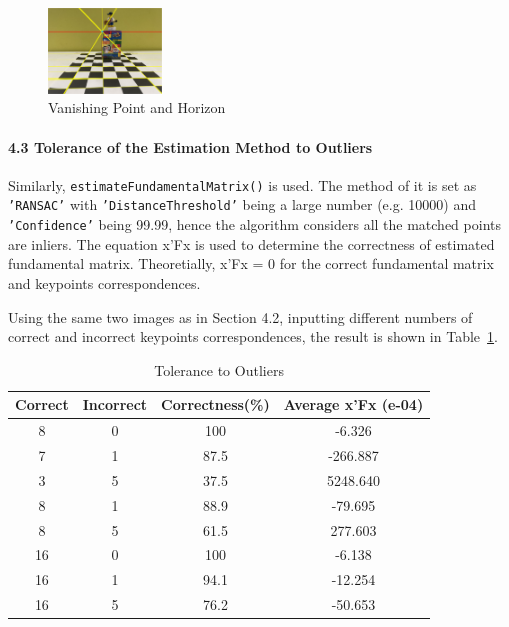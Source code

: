 \documentclass[10pt,twocolumn,letterpaper]{article}
\begin{document}
\begin{figure}[h]
\begin{center}
   \includegraphics[width=0.27\textwidth]{4.2b}
\end{center}
   \caption{Vanishing Point and Horizon}
\label{fig:6}
\end{figure}




\paragraph{4.3 Tolerance of the Estimation Method to Outliers}
Similarly, \texttt{\textcolor[RGB]{28,172,0}{estimateFundamentalMatrix()}} is used. The method of it is set as \texttt{\textcolor[RGB]{170,4,249}{'RANSAC'}} with \texttt{\textcolor[RGB]{170,4,249}{'DistanceThreshold'}} being a large number (e.g. 10000) and \texttt{\textcolor[RGB]{170,4,249}{'Confidence'}} being 99.99, hence the algorithm considers all the matched points are inliers. The equation x'Fx is used to determine the correctness of estimated fundamental matrix. Theoretially, x'Fx = 0 for the correct fundamental matrix and keypoints correspondences.

\noindent Using the same two images as in Section 4.2, inputting different numbers of correct and incorrect keypoints correspondences, the result is shown in Table~\ref{tab:3}.

\begin{table}[h]
\small
    \centering
    \begin{tabular}{c|c|c|c}
        Correct & Incorrect & Correctness(\%) & Average x'Fx (e-04)\\
        \hline
        8 & 0 & 100 & -6.326\\ 
        \hline
        7 & 1 & 87.5 & -266.887\\ 
        \hline
        3 & 5 & 37.5 & 5248.640\\ 
        \hline
        8 & 1 & 88.9 & -79.695\\ 
        \hline
        8 & 5 & 61.5 & 277.603\\ 
        \hline
        16 & 0 & 100 & -6.138\\ 
        \hline
        16 & 1 & 94.1 & -12.254\\ 
        \hline
        16 & 5 & 76.2 & -50.653\\ 
    \end{tabular}%
    \medbreak
    \caption{Tolerance to Outliers}
    \label{tab:3}
\end{table}
\end{document}
